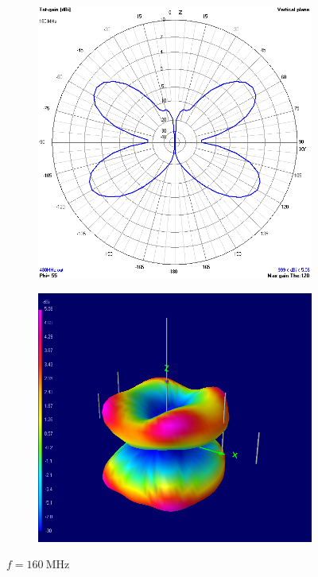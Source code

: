 \begin{figure}[H]
	\begin{subfigure}{0.5\textwidth}
		\includegraphics[scale=0.43]{imagenes/2D_160MHz.png}
	\end{subfigure}	
	\quad
	\begin{subfigure}{0.5\textwidth}
		\includegraphics[scale=0.43]{imagenes/3D_160MHz.png}
	\end{subfigure}
	\caption{$f=\SI{160}{\mega\hertz}$}
	\label{fig.radiacion_160M}
\end{figure}


